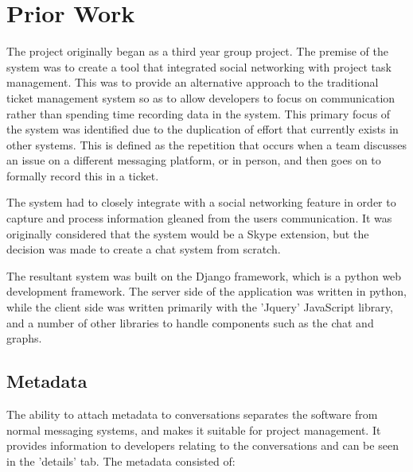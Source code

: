 \documentclass{l4proj}
\begin{document}
\section{Prior Work}

The project originally began as a third year group project.  The premise of the system was to create a tool that integrated social networking with project task management.  This was to provide an alternative approach to the traditional ticket management system so as to allow developers to focus on communication rather than spending time recording data in the system.  This primary focus of the system was identified due to the duplication of effort that currently exists in other systems.  This is defined as the repetition that occurs when a team discusses an issue on a different messaging platform, or in person, and then goes on to formally record this in a ticket.

The system had to closely integrate with a social networking feature in order to capture and process information gleaned from the users communication.  It was originally considered that the system would be a Skype extension, but the decision was made to create a chat system from scratch. 

The resultant system was built on the Django framework, which is a python web development framework.  The server side of the application was written in python, while the client side was written primarily with the 'Jquery' JavaScript library, and a number of other libraries to handle components such as the chat and graphs. 

\subsection{Metadata}
The ability to attach metadata to conversations separates the software from normal messaging systems, and makes it suitable for project management.  It provides information to developers relating to the conversations and can be seen in the 'details' tab.  The metadata consisted of:
\end{document}
